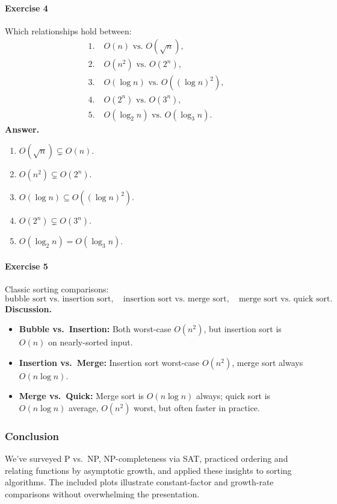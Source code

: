 \documentclass{article}
\theoremstyle{theorem}
\theoremstyle{definition}
\theoremstyle{remark}
\begin{document}
\paragraph*{Exercise 4}
Which relationships hold between:
\[
\begin{aligned}
1.\;&O(n)\text{ vs.\ }O(\sqrt n),\\
2.\;&O(n^2)\text{ vs.\ }O(2^n),\\
3.\;&O(\log n)\text{ vs.\ }O((\log n)^2),\\
4.\;&O(2^n)\text{ vs.\ }O(3^n),\\
5.\;&O(\log_2n)\text{ vs.\ }O(\log_3n).
\end{aligned}
\]
\textbf{Answer.}
\begin{enumerate}[label=\arabic*.]
  \item \(O(\sqrt n)\subsetneq O(n)\).
  \item \(O(n^2)\subsetneq O(2^n)\).
  \item \(O(\log n)\subseteq O((\log n)^2)\).
  \item \(O(2^n)\subsetneq O(3^n)\).
  \item \(O(\log_2n)=O(\log_3n)\).
\end{enumerate}

\paragraph*{Exercise 5}
Classic sorting comparisons:
\[
\text{bubble sort vs.\ insertion sort},\quad
\text{insertion sort vs.\ merge sort},\quad
\text{merge sort vs.\ quick sort}.
\]
\textbf{Discussion.}
\begin{itemize}
  \item \textbf{Bubble vs.\ Insertion:} Both worst-case \(O(n^2)\), but insertion sort is \(O(n)\) on nearly-sorted input.
  \item \textbf{Insertion vs.\ Merge:} Insertion sort worst-case \(O(n^2)\), merge sort always \(O(n\log n)\).
  \item \textbf{Merge vs.\ Quick:} Merge sort is \(O(n\log n)\) always; quick sort is \(O(n\log n)\) average, \(O(n^2)\) worst, but often faster in practice.
\end{itemize}

\subsubsection{Conclusion}
We’ve surveyed P vs.\ NP, NP-completeness via SAT, practiced ordering and relating functions by asymptotic growth, and applied these insights to sorting algorithms. The included plots illustrate constant-factor and growth-rate comparisons without overwhelming the presentation.
\end{document}
